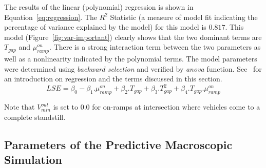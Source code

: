 \documentclass{wscpaperproc}
\theoremstyle{wsc}
\begin{document}
The results of the linear (polynomial) regression is shown in Equation~\ref{eq:regression}. The $R^2$ Statistic (a measure of model fit indicating the percentage of variance explained by the model) for this model is $0.817$. This model (Figure~\ref{fig:var-important}) clearly shows that the two dominant terms are $T_{gap}$ and $\mu^{on}_{ramp}$. There is a strong interaction term between the two parameters as well as a nonlinearity indicated by the polynomial terms. The model parameters were determined using {\it backward selection} and verified by {\it anova} function. See~ for an introduction on regression and the terms discussed in this section.
\begin{equation}
\label{eq:regression}
LSE=\beta_0-\beta_1.\mu^{on}_{ramp}+\beta_2.T_{gap}+\beta_3.T_{gap}^2+\beta_4.T_{gap}.\mu^{on}_{ramp}
\end{equation}

Note that $V_{min}^{out}$ is set to $0.0$ for on-ramps at intersection where vehicles come to a complete standstill.

\subsection{Parameters of the Predictive Macroscopic Simulation}
\end{document}
